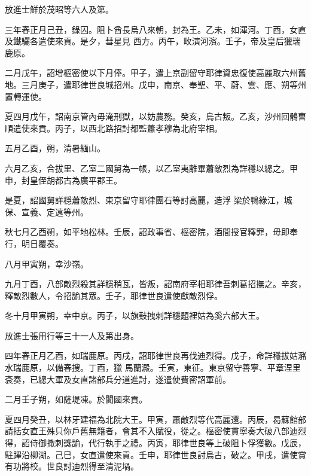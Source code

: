 \begin{pinyinscope}
 放進士鮮於茂昭等六人及第。



 三年春正月己丑，錄囚。阻卜酋長烏八來朝，封為王。乙未，如渾河。丁酉，女直及鐵驪各遣使來貢。是夕，彗星見
 西方。丙午，畋演河濱。壬子，帝及皇后獵瑞鹿原。



 二月戊午，詔增樞密使以下月俸。甲子，遣上京副留守耶律資忠復使高麗取六州舊地。三月庚子，遣耶律世良城招州。戊申，南京、奉聖、平、蔚、雲、應、朔等州置轉運使。



 夏四月戊午，詔南京管內毋淹刑獄，以妨農務。癸亥，烏古叛。乙亥，沙州回鶻曹順遣使來貢。丙子，以西北路招討都監蕭孝穆為北府宰相。



 五月乙酉，朔，清暑緬山。



 六月乙亥，合拔里、乙室二國舅為一帳，以乙室夷離畢蕭敵烈為詳穩以總之。甲申，封皇侄胡都古為廣平郡王。



 是夏，詔國舅詳穩蕭敵烈、東京留守耶律團石等討高麗，造浮
 梁於鴨綠江，城保、宣義、定遠等州。



 秋七月乙酉朔，如平地松林。壬辰，詔政事省、樞密院，酒間授官釋罪，毋即奉行，明日覆奏。



 八月甲寅朔，幸沙嶺。



 九月丁酉，八部敵烈殺其詳穩稍瓦，皆叛，詔南府宰相耶律吾刺葛招撫之。辛亥，釋敵烈數人，令招諭其眾。壬子，耶律世良遣使獻敵烈俘。



 冬十月甲寅朔，幸中京。丙子，以旗鼓拽刺詳穩題裡姑為奚六部大王。



 放進士張用行等三十一人及第出身。



 四年春正月乙酉，如瑞鹿原。丙戌，詔耶律世良再伐迪烈得。戊子，命詳穩拔姑瀦水瑞鹿原，以備春搜。丁酉，獵
 馬蘭澱。壬寅，東征。東京留守善寧、平章涅里袞奏，已總大軍及女直諸部兵分道進討，遂遣使費密詔軍前。



 二月壬子朔，如薩堤凍。於闐國來貢。



 夏四月癸丑，以林牙建福為北院大王。甲寅，蕭敵烈等代高麗還。丙辰，曷蘇館部請括女直王殊只你戶舊無籍者，會其不入賦役，從之。樞密使貫寧奏大破八部迪烈得，詔侍御撒刺獎諭，代行執手之禮。丙寅，耶律世良等上破阻卜俘獲數。戊辰，駐蹕沿柳湖。己巳，女直遣使來貢。壬申，耶律世良討烏古，破之。甲戌，遣使賞有功將校。世良討迪烈得至清泥堝。




\end{pinyinscope}
